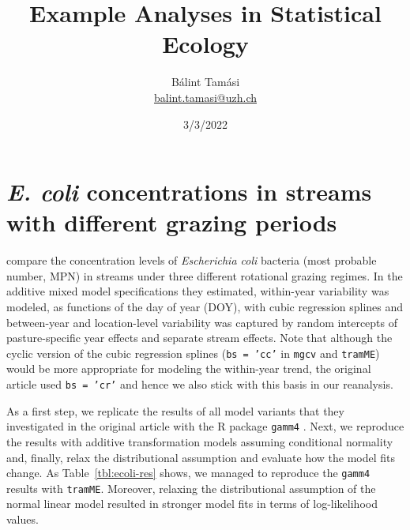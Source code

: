 \documentclass[11pt]{article}\usepackage[]{graphicx}\usepackage{xcolor}
\title{Example Analyses in Statistical Ecology}
\author{B\'alint Tam\'asi \\ {\small \url{balint.tamasi@uzh.ch}}}
\date{3/3/2022}
\newcommand{\pkg}[1]{\texttt{#1}}
\newcommand{\0}{{\mathbf{0}}}
\begin{document}
\maketitle



\section{\emph{E. coli} concentrations in streams
  with different grazing periods}\label{sec:ecoli}

\citet{Hulvey_2021} compare the concentration levels
of \emph{Escherichia coli} bacteria (most probable number, MPN)
in streams under three different rotational grazing regimes.
In the additive mixed model specifications they estimated,
within-year variability was modeled,
as functions of the day of year (DOY),
with cubic regression splines
and between-year and location-level variability was captured by
random intercepts of pasture-specific year effects and separate stream effects.
Note that although the cyclic version of the cubic regression splines
(\texttt{bs = 'cc'} in \pkg{mgcv} and \pkg{tramME})
would be more appropriate for modeling the within-year trend,
the original article used \texttt{bs = 'cr'}
and hence we also stick with this basis in our reanalysis.



As a first step,
we replicate the results of all model variants
that they investigated in the original article
with the \textsf{R} package \pkg{gamm4} \citep{gamm4}.
Next, we reproduce the results with additive transformation models
assuming conditional normality
and, finally, relax the distributional assumption and
evaluate how the model fits change.
As Table~\ref{tbl:ecoli-res} shows,
we managed to reproduce the \pkg{gamm4} results with \pkg{tramME}.
Moreover, relaxing the distributional assumption of the
normal linear model resulted in stronger model fits
in terms of log-likelihood values.
\end{document}
